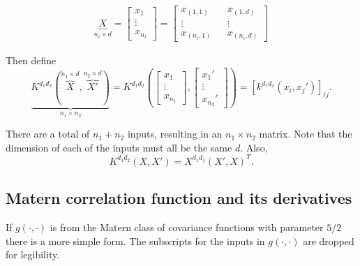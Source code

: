 \documentclass{sfuthesis}
\begin{document}
\begin{align}
\underbrace X_{{n_i} \times d} = \left[ {\begin{array}{*{20}{c}}
{{x_1}}\\
 \vdots \\
{{x_{{n_i}}}}
\end{array}} \right] = \left[ {\begin{array}{*{20}{c}}
{{x_{\left( {1,1} \right)}}}&{}&{{x_{\left( {1,d} \right)}}}\\
 \vdots &{}& \vdots \\
{{x_{\left( {{n_i},1} \right)}}}&{}&{{x_{\left( {{n_i},d} \right)}}}
\end{array}} \right]
\end{align}

Then define
\begin{equation}
  \underbrace {{K^{{d_1}{d_2}}}\left( {\overbrace X^{{n_1} \times d},\overbrace {X'}^{{n_2} \times d}} \right)}_{{n_1} \times {n_2}} = {K^{{d_1}{d_2}}}\left( {\left[ {\begin{array}{*{20}{c}}
{{x_1}}\\
 \vdots \\
{{x_{{n_1}}}}
\end{array}} \right],\left[ {\begin{array}{*{20}{c}}
{{x_1}'}\\
 \vdots \\
{{x_{{n_2}}}'}
\end{array}} \right]} \right) = {\left[ {{k^{{d_1}{d_2}}}\left( {{x_i},{x_j}'} \right)} \right]_{ij}}.
\end{equation}

There are a total of $n_1 + n_2$ inputs, resulting in an $n_1 \times n_2$ matrix. Note that the dimension of each of the inputs must all be the same $d$. 
Also,
\begin{equation}
  {K^{{d_1}{d_2}}}\left( {X,X'} \right) = {X^{{d_1}{d_1}}}{\left( {X',X} \right)^T}.
\end{equation}


\subsection{Matern correlation function and its derivatives}

If $g(\cdot, \cdot)$ is from the Matern class of covariance functions with parameter $5/2$ there is a more simple form. The subscripts for the inputs in $g(\cdot, \cdot)$ are dropped for legibility. 
\end{document}
